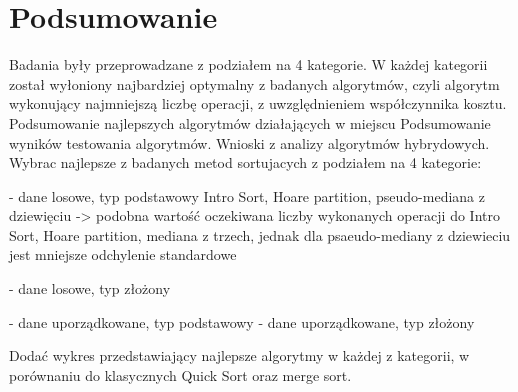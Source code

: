 \chapter{Podsumowanie}
\thispagestyle{chapterBeginStyle}

Badania były przeprowadzane z podziałem na 4 kategorie. W każdej kategorii został wyłoniony najbardziej optymalny z badanych algorytmów, czyli algorytm wykonujący najmniejszą liczbę operacji, z uwzględnieniem współczynnika kosztu.
Podsumowanie najlepszych algorytmów działających w miejscu
Podsumowanie wyników testowania algorytmów. Wnioski z analizy algorytmów hybrydowych.
Wybrac najlepsze z badanych metod sortujacych z podziałem na 4 kategorie:

- dane losowe, typ podstawowy
Intro Sort, Hoare partition, pseudo-mediana z dziewięciu -> podobna wartość oczekiwana liczby wykonanych operacji do Intro Sort, Hoare partition, mediana z trzech, jednak dla psaeudo-mediany z dziewieciu jest mniejsze odchylenie standardowe

- dane losowe, typ złożony

- dane uporządkowane, typ podstawowy
- dane uporządkowane, typ złożony

Dodać wykres przedstawiający najlepsze algorytmy w każdej z kategorii, w porównaniu do klasycznych Quick Sort oraz merge sort.
